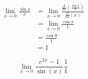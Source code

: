 \documentclass[12pt]{article}
\begin{document}
\begin{align*}
    \lim_{x \to 0}
    \frac{\sin{x}}{x}
    & = \lim_{x \to 0}
    \frac
    {\frac{d}{dx}\left( \frac{\sin{x}}{x} \right)}
    {\frac{d}{dx}\left( {x} \right)} \\
    & = \lim_{x \to 0}
    \frac{\cos{x}}{1} \\
    & = \frac{\cos{0}}{1} \\
    & = 1
\end{align*}

\begin{equation}
    \lim_{x \to 0}
    \frac{e^{2x}-1}{\sin(x)}\frac{1}{1}
\end{equation}
\end{document}
